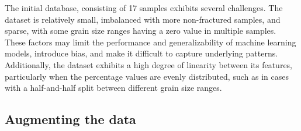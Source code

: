 \documentclass[10pt]{article}
\newcommand{\fontsmall}{\fontsize{8pt}{9pt}\selectfont}
\begin{document}
\begin{multicols}{2}
\begin{minipage}[t]{\columnwidth}
  \fontsmall
\end{minipage}

The initial database, consisting of 17 samples exhibits several challenges. The dataset is relatively small, imbalanced with more non-fractured samples, and sparse, with some grain size ranges having a zero value in multiple samples. These factors may limit the performance and generalizability of machine learning models, introduce bias, and make it difficult to capture underlying patterns. Additionally, the dataset exhibits a high degree of linearity between its features, particularly when the percentage values are evenly distributed, such as in cases with a half-and-half split between different grain size ranges.

\subsection{Augmenting the data}


\end{multicols}
\end{document}
